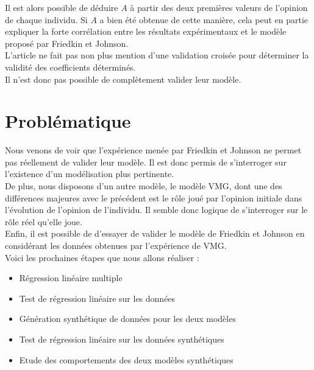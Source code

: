 \documentclass{scrreprt}
\begin{document}
Il est alors possible de déduire $A$ à partir des deux premières valeurs de l'opinion de chaque individu. Si $A$ a bien été obtenue de cette manière, cela peut en partie expliquer la forte corrélation entre les résultats expérimentaux et le modèle proposé par Friedkin et Johnson.\\

L'article ne fait pas non plus mention d'une validation croisée pour déterminer la validité des coefficients déterminés.\\

Il n'est donc pas possible de complètement valider leur modèle.\\

\section{Problématique}

Nous venons de voir que l’expérience menée par Friedkin et Johnson ne permet pas réellement de valider leur modèle. Il est donc permis de s'interroger sur l'existence d'un modélisation plus pertinente.\\

De plus, nous disposons d’un autre modèle, le modèle VMG, dont une des différences majeures avec le précédent est le rôle joué par l’opinion initiale dans l'évolution de l'opinion de l'individu. Il semble donc logique de s’interroger sur le rôle réel qu’elle joue.\\

Enfin, il est possible de d’essayer de valider le modèle de Friedkin et Johnson en considérant les données obtenues par l’expérience de VMG.\\%

Voici les prochaines étapes que nous allons réaliser :

\begin{itemize}
\item Régression linéaire multiple
\item Test de régression linéaire sur les données
\item Génération synthétique de données pour les deux modèles
\item Test de régression linéaire sur les données synthétiques
\item Etude des comportements des deux modèles synthétiques
\end{itemize}




\end{document}
